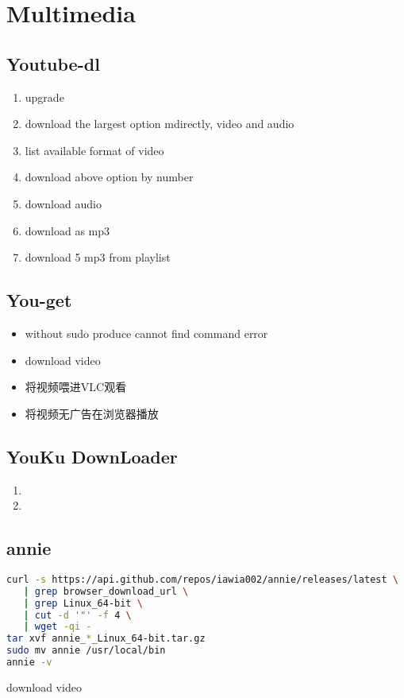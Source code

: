 \chapter{Multimedia}

\section{Youtube-dl}

\begin{enumerate}
\item {} upgrade
\item {} download the largest option mdirectly, video and audio
\item {} list available format of video
\item {} download above option by number
\item {} download audio
\item {} download as mp3
\item {} download 5 mp3 from playlist
\end{enumerate}

\section{You-get}
\begin{itemize}
\item{} without sudo produce cannot find command error
\item{} download video
\item{} 将视频喂进VLC观看
\item{} 将视频无广告在浏览器播放
\end{itemize}

\section{YouKu DownLoader}
\begin{enumerate}
\item {}
\item {}
\end{enumerate}

\section{annie}
\begin{lstlisting}[language=bash, caption={Download and Install Annie}]
curl -s https://api.github.com/repos/iawia002/annie/releases/latest \
   | grep browser_download_url \
   | grep Linux_64-bit \
   | cut -d '"' -f 4 \
   | wget -qi -
tar xvf annie_*_Linux_64-bit.tar.gz
sudo mv annie /usr/local/bin
annie -v
\end{lstlisting}
\cmd{annie URL} download video

